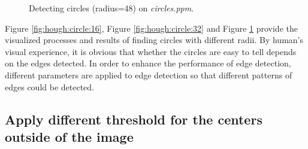 \documentclass[paper=a4, fontsize=11pt]{scrartcl}
\numberwithin{equation}{section}		%
\numberwithin{figure}{section}			%
\begin{document}
\begin{figure}[h]
\centering
{}
\caption{Detecting circles (radius=48) on \emph{circles.ppm}.}
\label{fig:hough:circle:48}
\end{figure}

Figure \ref{fig:hough:circle:16}, Figure \ref{fig:hough:circle:32} and Figure \ref{fig:hough:circle:48} provide the visualized processes and results of finding circles with different radii.
By human's visual experience, it is obvious that whether the circles are easy to tell depends on the edges detected.
In order to enhance the performance of edge detection, different parameters are applied to edge detection so that different patterns of edges could be detected.

\subsection{Apply different threshold for the centers outside of the image}
\end{document}
